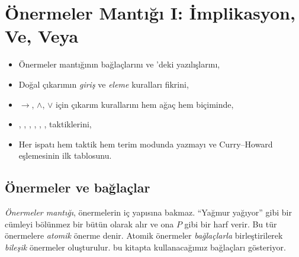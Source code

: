\chapter{Önermeler Mantığı I: İmplikasyon, Ve, Veya}\label{bol:onermeler1}

\begin{bolumhedefleri}
\begin{itemize}
  \item Önermeler mantığının bağlaçlarını ve \Lean{}'deki yazılışlarını,
  \item Doğal çıkarımın \emph{giriş} ve \emph{eleme} kuralları fikrini,
  \item $\to$, $\wedge$, $\vee$ için çıkarım kurallarını hem ağaç hem
        \Lean{} biçiminde,
  \item {}, , ,
        , , ,
         taktiklerini,
  \item Her ispatı hem taktik hem terim modunda yazmayı ve
        Curry--Howard eşlemesinin ilk tablosunu.
\end{itemize}
\end{bolumhedefleri}

\section{Önermeler ve bağlaçlar}\label{sec:baglaclar}

\emph{Önermeler mantığı}, önermelerin iç yapısına bakmaz. ``Yağmur
yağıyor'' gibi bir cümleyi bölünmez bir bütün olarak alır ve ona $P$ gibi
bir harf verir. Bu tür önermelere \emph{atomik} önerme denir. Atomik
önermeler \emph{bağlaçlarla} birleştirilerek \emph{bileşik} önermeler
oluşturulur.  bu kitapta kullanacağımız bağlaçları
gösteriyor.


